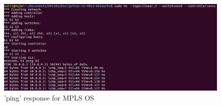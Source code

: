 \begin{figure}[H]
   \centering\includegraphics[width=\textwidth]{images/16_ICMP_responce_for_MPLS_OS.JPG}
   \caption{'ping' response for MPLS OS}
    \label{fig:compbest}
\end{figure}











